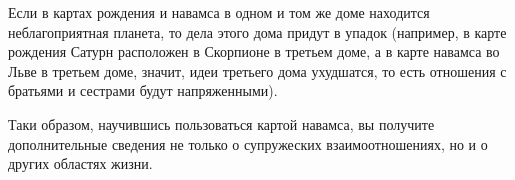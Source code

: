 Если в картах рождения и навамса в одном и том же доме находится неблагоприятная планета, то дела этого дома придут в упадок (например, в карте рождения Сатурн расположен в Скорпионе в третьем доме, а в карте навамса во Льве в третьем доме, значит, идеи третьего дома ухудшатся, то есть отношения с братьями и сестрами будут напряженными).

Таки образом, научившись пользоваться картой навамса, вы получите дополнительные сведения не только о супружеских взаимоотношениях, но и о других областях жизни.
